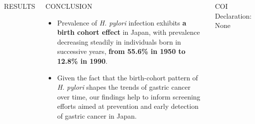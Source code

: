 \documentclass[english,xcolor=table,t
]{beamer}
\begin{document}
\begin{frame}
\begin{columns}
\begin{block}{RESULTS}
\end{block}

\begin{block}{CONCLUSION}

\begin{itemize}
\item
  Prevalence of \emph{H. pylori} infection exhibits \textbf{a birth
  cohort effect} in Japan, with prevalence decreasing steadily in
  individuals born in successive years, \textbf{from 55.6\% in 1950 to
  12.8\% in 1990}.
\item
  Given the fact that the birth-cohort pattern of \emph{H. pylori}
  shapes the trends of gastric cancer over time, our findings help to
  inform screening efforts aimed at prevention and early detection of
  gastric cancer in Japan.
\end{itemize}

\end{block}

\begin{block}{COI Declaration: None}

\end{block}

\end{columns}

\end{frame}
\end{document}
